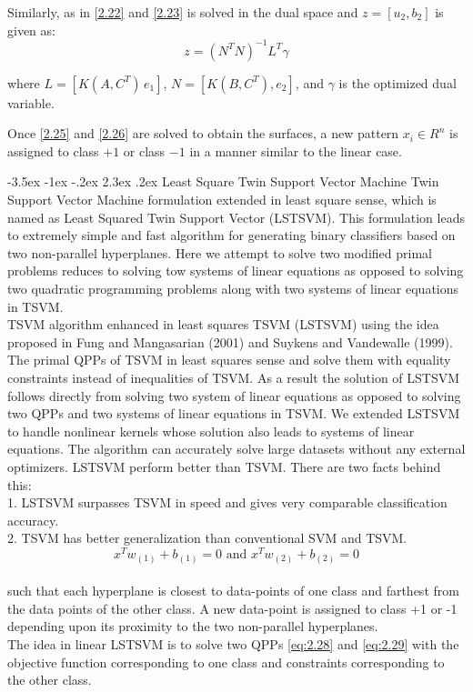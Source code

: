 \documentclass[12pt,a4paper,oneside,english]{report}
\makeatletter
\renewcommand\section{\@startsection {section}{1}{\z@}%
                                   {-3.5ex \@plus -1ex \@minus -.2ex}%
                                   {2.3ex \@plus.2ex}%
                                   {\centering\normalfont\LARGE\bfseries}}
\makeatother
\begin{document}
Similarly, as in \eqref{2.22} and \eqref{2.23} is solved in the dual space and \( z = [u_2, b_2] \) is given as:
\begin{equation} \label{2.26}
    z = (N^T N)^{-1} L^T \gamma
\end{equation}

where \( L = [K(A, C^T) \, e_1] \), \( N = [K(B, C^T), e_2] \), and \( \gamma \) is the optimized dual variable.

Once \eqref{2.25} and \eqref{2.26} are solved to obtain the surfaces, a new pattern \( x_i \in R^n \) is assigned to class \( +1 \) or class \( -1 \) in a manner similar to the linear case.




\section{Least Square Twin Support Vector Machine}
Twin Support Vector Machine formulation extended in least square sense, which is named as Least Squared Twin Support Vector (LSTSVM). This formulation leads to extremely simple and fast algorithm for generating binary classifiers based on two non-parallel hyperplanes. Here we attempt to solve two modified primal problems reduces to solving tow systems of linear equations as opposed to solving two quadratic programming problems along with two systems of linear equations in TSVM.\\
TSVM algorithm enhanced in least squares TSVM (LSTSVM) using the idea proposed in Fung and Mangasarian (2001) and Suykens and Vandewalle (1999). The primal QPPs of TSVM in least squares sense and solve them with equality constraints instead of inequalities of TSVM. As a result the solution of LSTSVM follows directly from solving two system of linear equations as opposed to solving two QPPs and two systems of linear  equations in TSVM. We extended LSTSVM to handle nonlinear kernels whose solution also leads to systems of linear equations. The algorithm can accurately solve large datasets without any external optimizers. LSTSVM perform better than TSVM. There are two facts behind this: \\
1. LSTSVM surpasses TSVM in speed and gives very comparable classification accuracy. \\
2. TSVM has better generalization than conventional SVM and TSVM. \\
\begin{equation}
    x^Tw_{(1)} + b_{(1)} = 0 \text{ and } x^Tw_{(2)} + b_{(2)} = 0
\end{equation}
\\
such that each hyperplane is closest to data-points of one class and farthest from the data points of the other class. A new data-point is assigned to class +1 or -1 depending upon its proximity to the two non-parallel hyperplanes.\\
The idea in linear LSTSVM is to solve two QPPs \ref{eq:2.28} and \ref{eq:2.29} with the objective function corresponding to one class and constraints corresponding to the other class. \\
\end{document}
